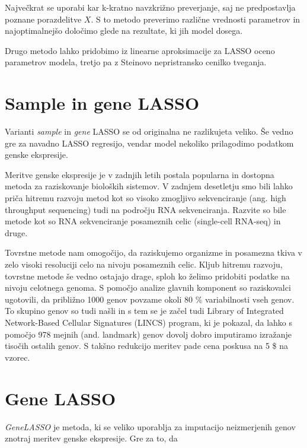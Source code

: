 \documentclass[onecolumn]{report}
\begin{document}
Največkrat se uporabi kar k-kratno navzkrižno preverjanje, saj ne predpostavlja poznane porazdelitve $X$. S to metodo preverimo različne vrednosti parametrov in najoptimalnejšo določimo glede na rezultate, ki jih model dosega. 

Drugo metodo lahko pridobimo iz linearne aproksimacije za LASSO oceno parametrov modela, tretjo pa z Steinovo nepristransko cenilko tveganja. 

\section{Sample in gene LASSO}

Varianti \emph{sample} in \emph{gene} LASSO se od originalna ne razlikujeta veliko. Še vedno gre za navadno LASSO regresijo, vendar model nekoliko prilagodimo podatkom genske ekspresije.

Meritve genske ekspresije je v zadnjih letih postala popularna in dostopna metoda za raziskovanje bioloških sistemov. V zadnjem desetletju smo bili lahko priča hitremu razvoju metod kot so visoko zmogljivo sekvenciranje (ang. high throughput sequencing) tudi na področju RNA sekvenciranja. Razvite so bile metode kot so RNA sekvenciranje posameznih celic (single-cell RNA-seq) in druge.

Tovrstne metode nam omogočijo, da raziskujemo organizme in posamezna tkiva v zelo visoki resoluciji celo na nivoju posameznih celic. Kljub hitremu razvoju, tovrstne metode še vedno ostajajo drage, sploh ko želimo pridobiti podatke na nivoju celotnega  genoma. S pomočjo analize glavnih komponent so raziskovalci ugotovili, da približno 1000 genov povzame okoli 80 \% variabilnosti vseh genov. To skupino genov so tudi našli in s tem se je začel tudi Library of Integrated Network-Based Cellular Signatures (LINCS) program, ki je pokazal, da lahko s pomočjo 978 mejnih (and. landmark) genov dovolj dobro imputiramo izražanje tisočih ostalih genov. S takšno redukcijo meritev pade cena poskusa na 5 \$ na vzorec. 



\section*{Gene LASSO}

\emph{GeneLASSO} je metoda, ki se veliko uporablja za imputacijo neizmerjenih genov znotraj meritev genske ekspresije. Gre za to, da 
\end{document}

